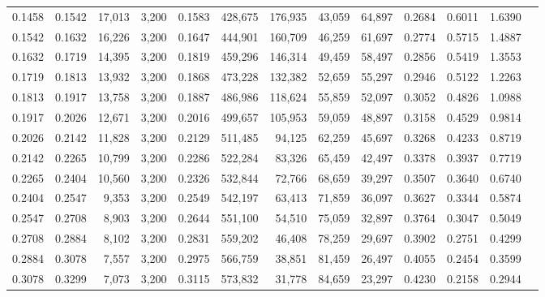 \begin{tabular}{rrrrrrrrrrrrr}
0.1458 & 0.1542 & 17,013 & 3,200 &                                     0.1583 & 428,675 & 176,935 &  43,059 &  64,897 & 0.2684 & 0.6011 & 1.6390 \\
0.1542 & 0.1632 & 16,226 & 3,200 &                                     0.1647 & 444,901 & 160,709 &  46,259 &  61,697 & 0.2774 & 0.5715 & 1.4887 \\
0.1632 & 0.1719 & 14,395 & 3,200 &                                     0.1819 & 459,296 & 146,314 &  49,459 &  58,497 & 0.2856 & 0.5419 & 1.3553 \\
0.1719 & 0.1813 & 13,932 & 3,200 &                                     0.1868 & 473,228 & 132,382 &  52,659 &  55,297 & 0.2946 & 0.5122 & 1.2263 \\
0.1813 & 0.1917 & 13,758 & 3,200 &                                     0.1887 & 486,986 & 118,624 &  55,859 &  52,097 & 0.3052 & 0.4826 & 1.0988 \\
0.1917 & 0.2026 & 12,671 & 3,200 &                                     0.2016 & 499,657 & 105,953 &  59,059 &  48,897 & 0.3158 & 0.4529 & 0.9814 \\
0.2026 & 0.2142 & 11,828 & 3,200 &                                     0.2129 & 511,485 &  94,125 &  62,259 &  45,697 & 0.3268 & 0.4233 & 0.8719 \\
0.2142 & 0.2265 & 10,799 & 3,200 &                                     0.2286 & 522,284 &  83,326 &  65,459 &  42,497 & 0.3378 & 0.3937 & 0.7719 \\
0.2265 & 0.2404 & 10,560 & 3,200 &                                     0.2326 & 532,844 &  72,766 &  68,659 &  39,297 & 0.3507 & 0.3640 & 0.6740 \\
0.2404 & 0.2547 &  9,353 & 3,200 &                                     0.2549 & 542,197 &  63,413 &  71,859 &  36,097 & 0.3627 & 0.3344 & 0.5874 \\
0.2547 & 0.2708 &  8,903 & 3,200 &                                     0.2644 & 551,100 &  54,510 &  75,059 &  32,897 & 0.3764 & 0.3047 & 0.5049 \\
0.2708 & 0.2884 &  8,102 & 3,200 &                                     0.2831 & 559,202 &  46,408 &  78,259 &  29,697 & 0.3902 & 0.2751 & 0.4299 \\
0.2884 & 0.3078 &  7,557 & 3,200 &                                     0.2975 & 566,759 &  38,851 &  81,459 &  26,497 & 0.4055 & 0.2454 & 0.3599 \\
0.3078 & 0.3299 &  7,073 & 3,200 &                                     0.3115 & 573,832 &  31,778 &  84,659 &  23,297 & 0.4230 & 0.2158 & 0.2944 \\

\end{tabular}
